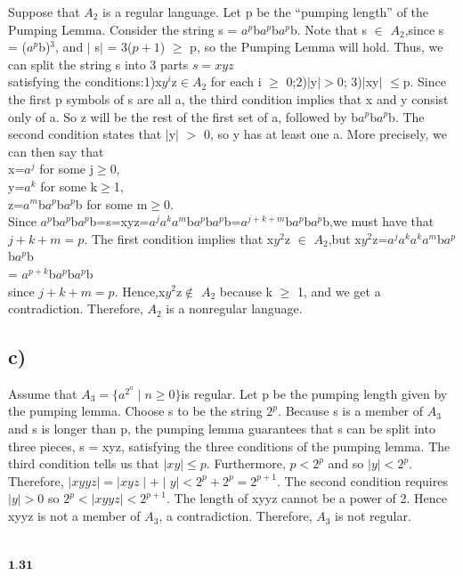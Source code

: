 \documentclass{scrartcl}
\begin{document}
Suppose that $A_2$ is a regular language. Let p be the “pumping length”
of the Pumping Lemma. Consider the string s = $a^p$b$a^p$b$a^p$b. Note that 
s $\in$ $A_2$,since s = ($a^p$b)$^3$, and $\mid$ s$\mid$ = 3($p + 1$) $\geq$ p, 
so the Pumping Lemma will hold. Thus, we can split the string s into 3 parts $s = xyz$
 \\satisfying the conditions:1)x$y^i$z$\in$$A_2$ for each i $\geq$ 0;2)$\mid$y$\mid$$>$0;
3)$\mid$xy$\mid$ $\leq$p. Since the first p symbols of s are all a, the third condition
implies that x and y consist only of a. So z will be the rest of the first set of a,
followed by b$a^p$b$a^p$b. The second condition states that $\mid$y$\mid$ $>$ 0, so y has at
 least one a. More precisely, we can then say that \\
x=$a^j$ for some j$\geq$0,\\
y=$a^k$ for some k$\geq$1,\\
z=$a^m$b$a^p$b$a^p$b for some m$\geq$0.\\
Since $a^p$b$a^p$b$a^p$b=s=xyz=$a^j$$a^k$$a^m$b$a^p$b$a^p$b=$a^{j+k+m}$b$a^p$b$a^p$b,we must
have that$ j+k+m = p$. The first condition implies that x$y^2$z $\in$ $A_2$,but 
x$y^2$z=$a^j$$a^k$$a^k$$a^m$b$a^p$b$a^p$b\\
  = $a^{p+k}$b$a^p$b$a^p$b\\
since  $j + k + m = p$. Hence,x$y^2$z$\notin$ $A_2$ because k $\geq$ 1, and we get a contradiction.
Therefore, $A_2$ is a nonregular language.





\subsection*{c)}


Assume that $A_3 = \{a^{2^n}\mid n \geq 0\} $is regular. Let p be the pumping length given
by the pumping lemma. Choose s to be the string $2^p$. Because s is a member of
$A_3$ and s is longer than p, the pumping lemma guarantees that s can be split into
three pieces, s = xyz, satisfying the three conditions of the pumping lemma.
The third condition tells us that $\mid xy \mid \leq p$. Furthermore, $p < 2^p$ and so $\mid y\mid < 2^p$.
Therefore, $\mid xyyz \mid  = \mid xyz \mid+ \mid y \mid < 2^p+2^p = 2^{p+1}$. The second condition requires
$\mid y \mid > 0$ so $2^p < \mid xyyz \mid < 2^{p+1}$. The length of xyyz cannot be a power of 2. Hence
xyyz is not a member of $A_3$, a contradiction. Therefore, $A_3$ is not regular.
\\
\\
\\
\noindent$\textbf{1.31}$
\\
\\
\end{document}
